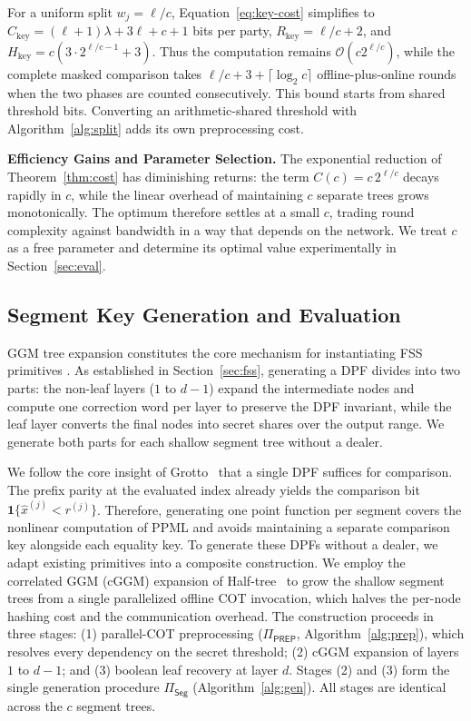 \documentclass[journal]{IEEEtran}
\theoremstyle{definition}
\theoremstyle{plain}
\newcommand{\ind}[1]{\mathbf{1}\{#1\}}
\newcommand{\xhat}{\hat{x}}
\newcommand{\PREP}{\Pi_{\mathsf{PREP}}}
\newcommand{\bigO}{\mathcal{O}}
\newcommand{\seg}[1]{^{\scriptscriptstyle(#1)}}   %
\newcommand{\nseg}{c}                              %
\newcommand{\wseg}{w}                              %
\begin{document}
For a uniform split $\wseg_j=\ell/\nseg$, Equation~\eqref{eq:key-cost}
simplifies to
$C_{\mathrm{key}}=(\ell+1)\lambda+3\ell+\nseg+1$ bits per party,
$R_{\mathrm{key}}=\ell/\nseg+2$, and
$H_{\mathrm{key}}=\nseg(3\cdot2^{\ell/\nseg-1}+3)$. Thus the computation remains
$\bigO(\nseg2^{\ell/\nseg})$, while the complete masked comparison takes
$\ell/\nseg+3+\lceil\log_2\nseg\rceil$ offline-plus-online rounds when the two
phases are counted consecutively.
This bound starts from shared threshold bits. Converting an arithmetic-shared
threshold with Algorithm~\ref{alg:split} adds its own preprocessing cost.

\textbf{Efficiency Gains and Parameter Selection.} The exponential reduction of 
Theorem~\ref{thm:cost} has diminishing returns: the term $C(\nseg)=\nseg\,2^{\ell/\nseg}$ decays 
rapidly in $\nseg$, while the linear overhead of maintaining $\nseg$ separate trees grows 
monotonically. The optimum therefore settles at a small $\nseg$, trading round complexity 
against bandwidth in a way that depends on the network. We treat $\nseg$ as a free parameter 
and determine its optimal value experimentally in Section~\ref{sec:eval}.


\subsection{Segment Key Generation and Evaluation}\label{sec:spine}
GGM tree expansion constitutes the core mechanism for instantiating FSS primitives \cite{bgi15,bgi16}.
As established in Section~\ref{sec:fss}, generating a DPF divides into two parts: the non-leaf
layers ($1$ to $d{-}1$) expand the intermediate nodes and compute one correction word per layer
to preserve the DPF invariant, while the leaf layer converts the final nodes into secret shares
over the output range. We generate both parts for each shallow segment tree without a dealer.

We follow the core insight of Grotto~\cite{grotto} that
a single DPF suffices for comparison. The prefix parity at the
evaluated index already yields the comparison bit $\ind{\xhat\seg{j}<r\seg{j}}$.
Therefore, generating one point function per segment covers
the nonlinear computation of PPML and avoids maintaining a
separate comparison key alongside each equality key.
To generate these DPFs without a dealer, we adapt existing
primitives into a composite construction. We employ the correlated GGM (cGGM)
expansion of Half-tree~\cite{halftree} to grow the shallow segment
trees from a single parallelized offline COT invocation, which halves
the per-node hashing cost and the communication overhead. The construction proceeds in
three stages: (1) parallel-COT preprocessing ($\PREP$, Algorithm~\ref{alg:prep}),
which resolves every dependency on the secret threshold; (2) cGGM expansion of layers
$1$ to $d{-}1$; and (3) boolean leaf recovery at layer $d$. Stages (2) and (3) form the
single generation procedure $\Pi_{\mathsf{Seg}}$ (Algorithm~\ref{alg:gen}). All stages are
identical across the $\nseg$ segment trees.
\end{document}
